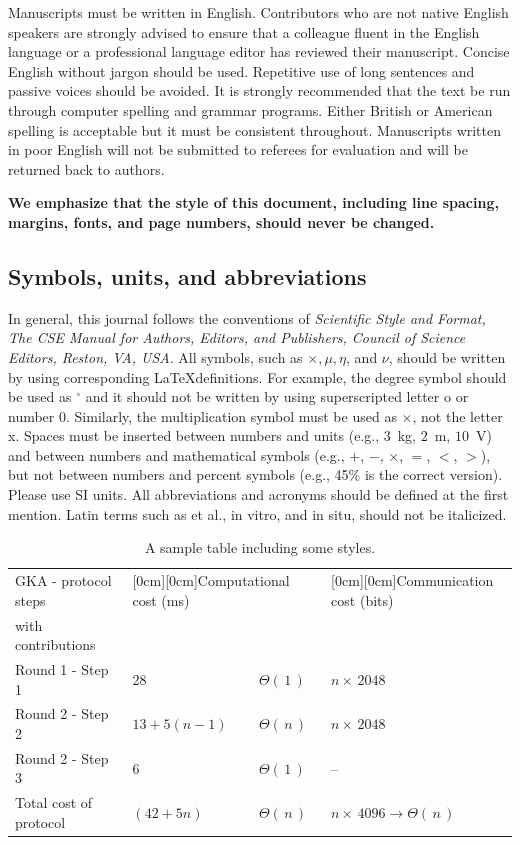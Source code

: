 \documentclass{elektr}
\begin{document}
Manuscripts must be written in English. Contributors who are not native English speakers are strongly advised to ensure that a colleague fluent in the English language or a professional language editor has reviewed their manuscript. Concise English without jargon should be used. Repetitive use of long sentences and passive voices should be avoided. It is strongly recommended that the text be run through computer spelling and grammar programs. Either British or American spelling is acceptable but it must be consistent throughout. Manuscripts written in poor English will not be submitted to referees for evaluation and will be returned back to authors.  

\textbf{We emphasize that the style of this document, including line spacing, margins, fonts, and page numbers, should never be changed.}  

\subsection{Symbols, units, and abbreviations}

In general, this journal follows the conventions of \textit{Scientific Style and Format, The CSE Manual for Authors, Editors, and Publishers, Council of Science Editors, Reston, VA, USA}. All symbols, such as $\times, \mu, \eta$, and $\nu$, should be written by using corresponding \LaTeX definitions. For example, the degree symbol should be used as $^{\circ}$ and it should not be written by using superscripted letter o or number 0. Similarly, the multiplication symbol must be used as $\times$, not the letter x. Spaces must be inserted between numbers and units (e.g., $3$~kg, $2$~m, $10$~V) and between numbers and mathematical symbols (e.g., $+$, $-$, $\times$, $=$, $<$, $>$), but not between numbers and percent symbols (e.g., 45{\%} is the correct version). Please use SI units. All abbreviations and acronyms should be defined at the first mention. Latin terms such as et al., in vitro, and in situ, should not be italicized. 

\begin{table}[h!]
\caption{A sample table including some styles.}
\begin{center}
\begin{tabular}{|l|l|l|l|}
\hline
GKA - protocol steps & 
\multicolumn{2}{|l|}{\raisebox{-1.50ex}[0cm][0cm]{Computational cost (ms)}}& 
\raisebox{-1.50ex}[0cm][0cm]{Communication cost (bits)} \\
with contributions& 
\multicolumn{2}{|l|}{} & 
 \\
\hline
Round 1 - Step 1& 
28& 
${\Theta }(\, 1\, )$& 
$n\times \, 2048$ \\
\hline
Round 2 - Step 2& 
$13+5(n-1)$& 
${\Theta }(\, n\, )$& 
$n\times \, 2048$ \\
\hline
Round 2 - Step 3& 
6& 
${\Theta }(\, 1\, )$& 
-- \\
\hline
Total cost of protocol& 
$(42+5n)$& 
${\Theta }(\, n\, )$& 
${n\times \, }4096  \to  {\Theta }(\, n\, )$ \\
\hline
\end{tabular}
\label{tab1}
\end{center}\vs{-4mm}
\end{table}
\end{document}
